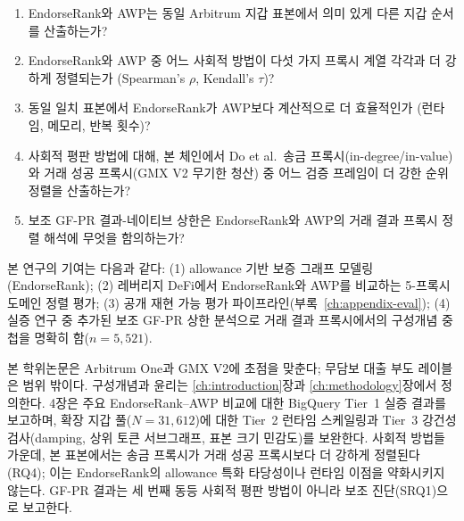 \begin{enumerate}
\item[\textbf{RQ1.}] EndorseRank와 AWP는 동일 Arbitrum 지갑 표본에서 의미 있게 다른 지갑 순서를 산출하는가?
\item[\textbf{RQ2.}] EndorseRank와 AWP 중 어느 사회적 방법이 다섯 가지 프록시 계열 각각과 더 강하게 정렬되는가 (Spearman's $\rho$, Kendall's $\tau$)?
\item[\textbf{RQ3.}] 동일 일치 표본에서 EndorseRank가 AWP보다 계산적으로 더 효율적인가 (런타임, 메모리, 반복 횟수)?
\item[\textbf{RQ4.}] 사회적 평판 방법에 대해, 본 체인에서 Do et al.\ 송금 프록시(in-degree/in-value)와 거래 성공 프록시(GMX V2 무기한 청산) 중 어느 검증 프레임이 더 강한 순위 정렬을 산출하는가?
\item[\textbf{SRQ1.}] 보조 GF-PR 결과-네이티브 상한은 EndorseRank와 AWP의 거래 결과 프록시 정렬 해석에 무엇을 함의하는가?
\end{enumerate}


본 연구의 기여는 다음과 같다: (1) allowance 기반 보증 그래프 모델링(EndorseRank); (2) 레버리지 DeFi에서 EndorseRank와 AWP를 비교하는 5-프록시 도메인 정렬 평가; (3) 공개 재현 가능 평가 파이프라인(부록~\ref{ch:appendix-eval}); (4) 실증 연구 중 추가된 보조 GF-PR 상한 분석으로 거래 결과 프록시에서의 구성개념 중첩을 명확히 함($n=5{,}521$).


본 학위논문은 Arbitrum One과 GMX V2에 초점을 맞춘다; 무담보 대출 부도 레이블은 범위 밖이다. 구성개념과 윤리는 \ref{ch:introduction}장과 \ref{ch:methodology}장에서 정의한다. 4장은 주요 EndorseRank--AWP 비교에 대한 BigQuery Tier~1 실증 결과를 보고하며, 확장 지갑 풀($N=31{,}612$)에 대한 Tier~2 런타임 스케일링과 Tier~3 강건성 검사(damping, 상위 토큰 서브그래프, 표본 크기 민감도)를 보완한다. 사회적 방법들 가운데, 본 표본에서는 송금 프록시가 거래 성공 프록시보다 더 강하게 정렬된다(RQ4); 이는 EndorseRank의 allowance 특화 타당성이나 런타임 이점을 약화시키지 않는다. GF-PR 결과는 세 번째 동등 사회적 평판 방법이 아니라 보조 진단(SRQ1)으로 보고한다.

